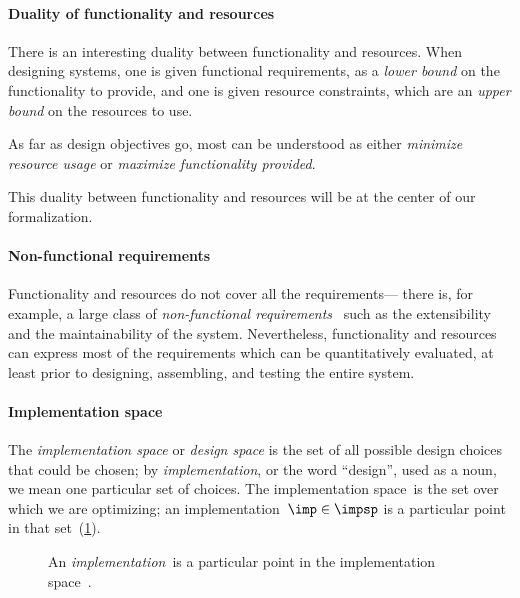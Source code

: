 \paragraph{Duality of functionality and resources}

There is an interesting duality between functionality and resources. When designing systems, one is given functional requirements, as a \emph{lower bound} on the functionality to provide, and one is given resource constraints, which are an \emph{upper bound} on the resources to use.

As far as design objectives go, most can be understood as either \emph{minimize resource usage}
or \emph{maximize functionality provided}.

This duality between functionality and resources will be at the
center of our formalization.

\paragraph{Non-functional requirements}

Functionality and resources do not cover all the requirements--- there is, for example, a
large class of \emph{non-functional requirements}~\cite{deweck2011} such as the extensibility and the
maintainability of the system. Nevertheless, functionality and resources can express most of
the requirements which can be quantitatively evaluated, at least prior to designing, assembling,
and testing the entire system.

\paragraph{Implementation space}

The \emph{implementation space} or \textit{design space} is the set of all possible design choices that could be chosen; by \textit{implementation}, or the word ``design'', used as a noun, we mean one particular set of choices. The implementation space~\impsp is the set over which we are optimizing; an implementation~$\imp\in\impsp$ is a particular point in that set~(\cref{fig:impspace}).

\begin{figure}[h!]
  \begin{center}
  \end{center}
  \caption{An \emph{implementation}~\imp is a particular point in the implementation space~\impsp.}
  \label{fig:impspace}
\end{figure}


